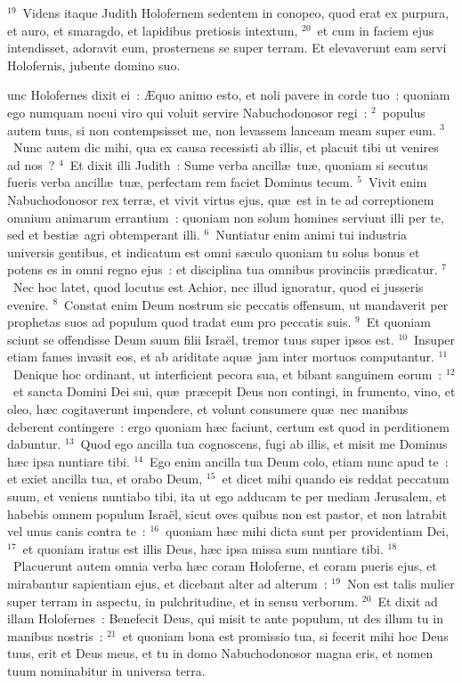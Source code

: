 ${}^{19}$~Videns itaque Judith Holofernem sedentem in conopeo, quod erat ex purpura, et auro, et smaragdo, et lapidibus pretiosis intextum,
${}^{20}$~et cum in faciem ejus intendisset, adoravit eum, prosternens se super terram. Et elevaverunt eam servi Holofernis, jubente domino suo.

\bchapter
{}unc Holofernes dixit ei~: \AE quo animo esto, et noli pavere in corde tuo~: quoniam ego numquam nocui viro qui voluit servire Nabuchodonosor regi~:
${}^{2}$~populus autem tuus, si non contempsisset me, non levassem lanceam meam super eum.
${}^{3}$~Nunc autem dic mihi, qua ex causa recessisti ab illis, et placuit tibi ut venires ad nos~?
${}^{4}$~Et dixit illi Judith~: Sume verba ancill\ae\ tu\ae , quoniam si secutus fueris verba ancill\ae\ tu\ae , perfectam rem faciet Dominus tecum.
${}^{5}$~Vivit enim Nabuchodonosor rex terr\ae , et vivit virtus ejus, qu\ae\ est in te ad correptionem omnium animarum errantium~: quoniam non solum homines serviunt illi per te, sed et besti\ae\ agri obtemperant illi.
${}^{6}$~Nuntiatur enim animi tui industria universis gentibus, et indicatum est omni s\ae culo quoniam tu solus bonus et potens es in omni regno ejus~: et disciplina tua omnibus provinciis pr\ae dicatur.
${}^{7}$~Nec hoc latet, quod locutus est Achior, nec illud ignoratur, quod ei jusseris evenire.
${}^{8}$~Constat enim Deum nostrum sic peccatis offensum, ut mandaverit per prophetas suos ad populum quod tradat eum pro peccatis suis.
${}^{9}$~Et quoniam sciunt se offendisse Deum suum filii Isra\"el, tremor tuus super ipsos est.
${}^{10}$~Insuper etiam fames invasit eos, et ab ariditate aqu\ae\ jam inter mortuos computantur.
${}^{11}$~Denique hoc ordinant, ut interficient pecora sua, et bibant sanguinem eorum~:
${}^{12}$~et sancta Domini Dei sui, qu\ae\ pr\ae cepit Deus non contingi, in frumento, vino, et oleo, h\ae c cogitaverunt impendere, et volunt consumere qu\ae\ nec manibus deberent contingere~: ergo quoniam h\ae c faciunt, certum est quod in perditionem dabuntur.
${}^{13}$~Quod ego ancilla tua cognoscens, fugi ab illis, et misit me Dominus h\ae c ipsa nuntiare tibi.
${}^{14}$~Ego enim ancilla tua Deum colo, etiam nunc apud te~: et exiet ancilla tua, et orabo Deum,
${}^{15}$~et dicet mihi quando eis reddat peccatum suum, et veniens nuntiabo tibi, ita ut ego adducam te per mediam Jerusalem, et habebis omnem populum Isra\"el, sicut oves quibus non est pastor, et non latrabit vel unus canis contra te~:
${}^{16}$~quoniam h\ae c mihi dicta sunt per providentiam Dei,
${}^{17}$~et quoniam iratus est illis Deus, h\ae c ipsa missa sum nuntiare tibi.
${}^{18}$~Placuerunt autem omnia verba h\ae c coram Holoferne, et coram pueris ejus, et mirabantur sapientiam ejus, et dicebant alter ad alterum~:
${}^{19}$~Non est talis mulier super terram in aspectu, in pulchritudine, et in sensu verborum.
${}^{20}$~Et dixit ad illam Holofernes~: Benefecit Deus, qui misit te ante populum, ut des illum tu in manibus nostris~:
${}^{21}$~et quoniam bona est promissio tua, si fecerit mihi hoc Deus tuus, erit et Deus meus, et tu in domo Nabuchodonosor magna eris, et nomen tuum nominabitur in universa terra.

